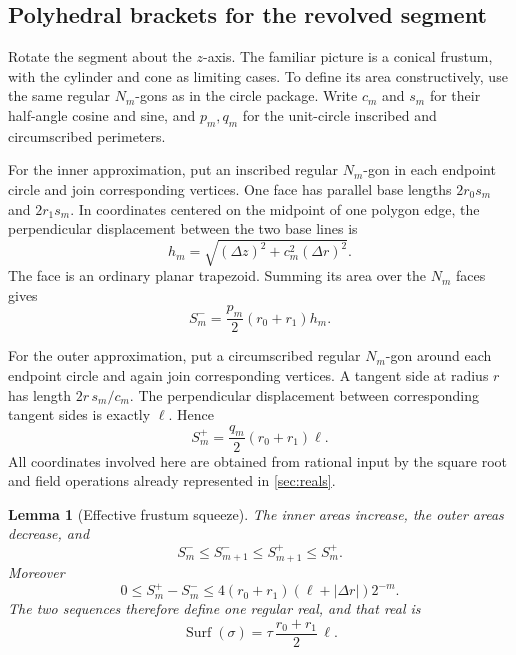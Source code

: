 \documentclass[11pt]{article}
\newtheorem{lemma}[theorem]{Lemma}
\theoremstyle{definition}
\newcommand{\Surf}{\operatorname{Surf}}
\newcommand{\abs}[1]{\left|#1\right|}
\begin{document}
\subsection{Polyhedral brackets for the revolved segment}

Rotate the segment about the $z$-axis.  The familiar picture is a conical
frustum, with the cylinder and cone as limiting cases.  To define its area
constructively, use the same regular $N_m$-gons as in the circle package.
Write $c_m$ and $s_m$ for their half-angle cosine and sine, and $p_m,q_m$ for
the unit-circle inscribed and circumscribed perimeters.

For the inner approximation, put an inscribed regular $N_m$-gon in each
endpoint circle and join corresponding vertices.  One face has parallel base
lengths $2r_0s_m$ and $2r_1s_m$.  In coordinates centered on the midpoint of
one polygon edge, the perpendicular displacement between the two base lines
is
\[
 h_m=\sqrt{(\Delta z)^2+c_m^2(\Delta r)^2}.
\]
The face is an ordinary planar trapezoid.  Summing its area over the $N_m$
faces gives
\begin{equation}
 S_m^-=\frac{p_m}{2}(r_0+r_1)h_m.
 \label{eq:inner-frustum}
\end{equation}

For the outer approximation, put a circumscribed regular $N_m$-gon around each
endpoint circle and again join corresponding vertices.  A tangent side at
radius $r$ has length $2r\,s_m/c_m$.  The perpendicular displacement between
corresponding tangent sides is exactly $\ell$.  Hence
\begin{equation}
 S_m^+=\frac{q_m}{2}(r_0+r_1)\ell.
 \label{eq:outer-frustum}
\end{equation}
All coordinates involved here are obtained from rational input by the square
root and field operations already represented in \cref{sec:reals}.

\begin{lemma}[Effective frustum squeeze]
\label{lem:frustum-squeeze}
The inner areas increase, the outer areas decrease, and
\[
 S_m^-\leq S_{m+1}^-\leq S_{m+1}^+\leq S_m^+.
\]
Moreover
\begin{equation}
 0\leq S_m^+-S_m^-
 \leq4(r_0+r_1)(\ell+\abs{\Delta r})2^{-m}.
 \label{eq:frustum-gap}
\end{equation}
The two sequences therefore define one regular real, and that real is
\begin{equation}
 \Surf(\sigma)=\tau\,\frac{r_0+r_1}{2}\,\ell.
 \label{eq:segment-surface}
\end{equation}
\end{lemma}
\end{document}
